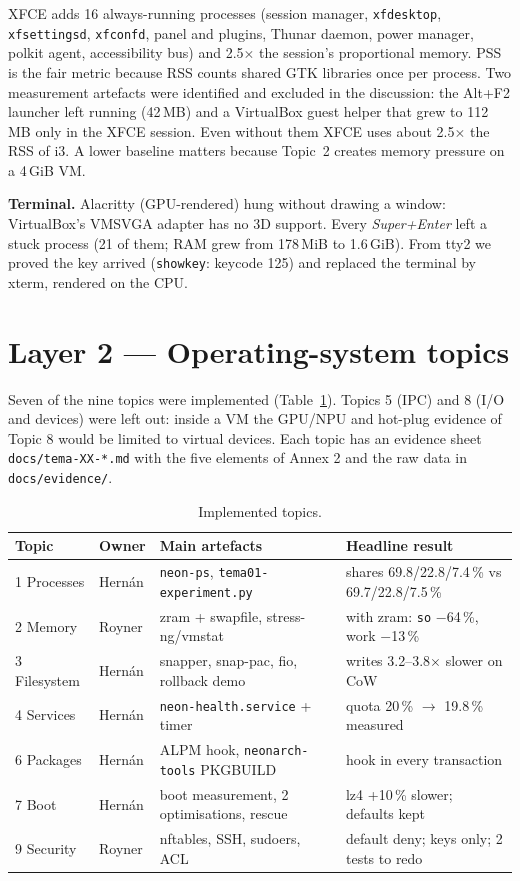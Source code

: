 \documentclass[10.5pt,a4paper]{article}
\newcommand{\cmd}[1]{\texttt{#1}}
\begin{document}
XFCE adds 16 always-running processes (session manager, \cmd{xfdesktop}, \cmd{xfsettingsd}, \cmd{xfconfd}, panel and plugins, Thunar daemon, power manager, polkit agent, accessibility bus) and 2.5$\times$ the session's proportional memory. PSS is the fair metric because RSS counts shared GTK libraries once per process. Two measurement artefacts were identified and excluded in the discussion: the Alt+F2 launcher left running (42\,MB) and a VirtualBox guest helper that grew to 112\,MB only in the XFCE session. Even without them XFCE uses about 2.5$\times$ the RSS of i3. A lower baseline matters because Topic~2 creates memory pressure on a 4\,GiB VM.

\textbf{Terminal.} Alacritty (GPU-rendered) hung without drawing a window: VirtualBox's VMSVGA adapter has no 3D support. Every \emph{Super+Enter} left a stuck process (21 of them; RAM grew from 178\,MiB to 1.6\,GiB). From tty2 we proved the key arrived (\cmd{showkey}: keycode 125) and replaced the terminal by xterm, rendered on the CPU.

\section{Layer 2 — Operating-system topics}
Seven of the nine topics were implemented (Table~\ref{tab:topics}). Topics 5 (IPC) and 8 (I/O and devices) were left out: inside a VM the GPU/NPU and hot-plug evidence of Topic 8 would be limited to virtual devices. Each topic has an evidence sheet \cmd{docs/tema-XX-*.md} with the five elements of Annex 2 and the raw data in \cmd{docs/evidence/}.

\begin{table}[H]
\centering\small
\begin{tabular}{@{}llll@{}}
\toprule
Topic & Owner & Main artefacts & Headline result\\ \midrule
1 Processes & Hernán & \cmd{neon-ps}, \cmd{tema01-experiment.py} & shares 69.8/22.8/7.4\,\% vs 69.7/22.8/7.5\,\%\\
2 Memory & Royner & zram + swapfile, stress-ng/vmstat & with zram: \cmd{so} $-$64\,\%, work $-$13\,\%\\
3 Filesystem & Hernán & snapper, snap-pac, fio, rollback demo & writes 3.2–3.8$\times$ slower on CoW\\
4 Services & Hernán & \cmd{neon-health.service} + timer & quota 20\,\% $\rightarrow$ 19.8\,\% measured\\
6 Packages & Hernán & ALPM hook, \cmd{neonarch-tools} PKGBUILD & hook in every transaction\\
7 Boot & Hernán & boot measurement, 2 optimisations, rescue & lz4 +10\,\% slower; defaults kept\\
9 Security & Royner & nftables, SSH, sudoers, ACL & default deny; keys only; 2 tests to redo\\
\bottomrule
\end{tabular}
\caption{Implemented topics.}
\label{tab:topics}
\end{table}
\end{document}
